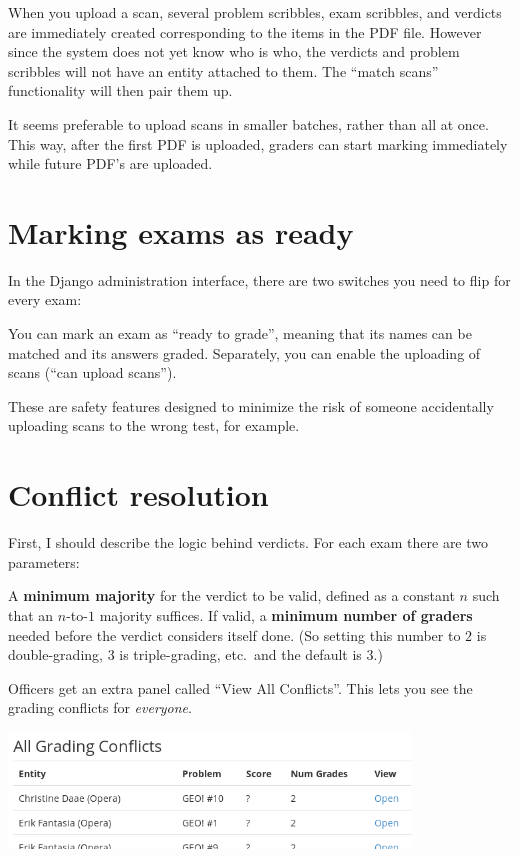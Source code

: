 When you upload a scan,
several problem scribbles, exam scribbles, and verdicts
are immediately created corresponding to the items in the PDF file.
However since the system does not yet know who is who,
the verdicts and problem scribbles will not have an entity attached to them.
The ``match scans'' functionality will then pair them up.

It seems preferable to upload scans in smaller batches,
rather than all at once.
This way, after the first PDF is uploaded,
graders can start marking immediately
while future PDF's are uploaded.

\section{Marking exams as ready}
In the Django administration interface,
there are two switches you need to flip for every exam:
\begin{itemize}
	\ii You can mark an exam as ``ready to grade'',
	meaning that its names can be matched and its answers graded.
	\ii Separately, you can enable the uploading of scans
	(``can upload scans'').
\end{itemize}
These are safety features designed to minimize the risk
of someone accidentally uploading scans to the wrong test, for example.

\section{Conflict resolution}
First, I should describe the logic behind verdicts.
For each exam there are two parameters:
\begin{itemize}
	\ii A \textbf{minimum majority} for the verdict to be valid,
	defined as a constant $n$ such that an $n$-to-$1$ majority suffices.
	\ii If valid, a \textbf{minimum number of graders} needed before
	the verdict considers itself done.
	(So setting this number to $2$ is double-grading,
	$3$ is triple-grading, etc.\ and the default is $3$.)
\end{itemize}

Officers get an extra panel called ``View All Conflicts''.
This lets you see the grading conflicts for \emph{everyone}.

\begin{center}
	\includegraphics[width=0.8\textwidth]{images/all-conflict.png}
\end{center}

